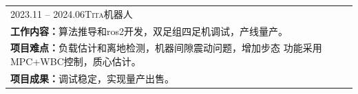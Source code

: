 
\begin{tabular}{ll} 
	\qquad \faStopCircleO \textsc{2023.11 -- 2024.06}\quad \textsc{Tita机器人}\\
	\qquad\qquad \textbf{工作内容：}算法推导和ros2开发，双足组四足机调试，产线量产。\\
	\qquad\qquad \textbf{项目难点：}负载估计和离地检测，机器间隙震动问题，增加步态 {功能采用MPC+WBC控制，质心估计。}\\
	\qquad\qquad \textbf{项目成果：}调试稳定，实现量产出售。\\
	
\end{tabular}

